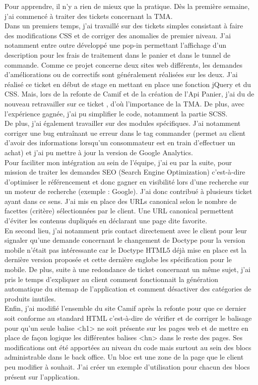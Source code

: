 \documentclass[12pt, a4paper, twoside]{report}
\begin{document}
Pour apprendre, il n'y a rien de mieux que la pratique. Dès la première semaine, j'ai commencé à traiter des tickets concernant la TMA. \\

Dans un premiers temps, j'ai travaillé sur des tickets simples consistant à faire des modifications CSS et de corriger des anomalies de premier niveau. J'ai notamment entre outre développé une pop-in permettant l'affichage d'un description pour les frais de traitement dans le panier et dans le tunnel de commande. Comme ce projet concerne deux sites web différents, les demandes d'améliorations ou de correctifs sont généralement réalisées sur les deux. J'ai réalisé ce ticket en début de stage en mettant en place une fonction jQuery et du CSS. Mais, lors de la refonte de Camif et de la création de l'Api Panier, j'ai du de nouveau retravailler sur ce ticket , d'où l'importance de la TMA. De plus, avec l'expérience gagnée, j'ai pu simplifier le code, notamment la partie SCSS. \\

De plus, j'ai également travailler sur des modules spécifiques. J'ai notamment corriger une bug entraînant ue erreur dans le tag commander (permet au client d'avoir des informations lorsqu'un consommateur est en train d'effectuer un achat) et j'ai pu mettre à jour la version de Google Analytics.  \\

Pour faciliter mon intégration au sein de l'équipe, j'ai eu par la suite, pour mission de traiter les demandes SEO (Search Engine Optimization) c'est-à-dire d'optimiser le référencement et donc gagner en visibilité lors d'une recherche sur un moteur de recherche (exemple : Google). J'ai donc contribué à plusieurs ticket ayant dans ce sens. J'ai mis en place des URLs canonical selon le nombre de facettes (critère) sélectionnées par le client. Une URL canonical permettent d'éviter les contenus dupliqués en déclarant une page dite favorite. \\
En second lieu, j'ai notamment pris contact directement avec le client pour leur signaler qu'une demande concernant le changement de Doctype pour la version mobile n'était pas intéressante car le Doctype HTML5 déjà mise en place est la dernière version proposée et cette dernière englobe les spécification pour le mobile. De plus, suite à une redondance de ticket concernant un même sujet, j'ai pris le temps d'expliquer au client comment fonctionnait la génération automatique du sitemap de l'application et comment désactiver des catégories de produits inutiles. \\
Enfin, j'ai modifié l'ensemble du site Camif après la refonte pour que ce dernier soit conforme au standard HTML c'est-à-dire de vérifier et de corriger le balisage pour qu'un seule balise <h1> ne soit présente sur les pages web et de mettre en place de façon logique les différentes balises <hn> dans le reste des pages. Ses modifications ont été apportées au niveau du code mais surtout au sein des blocs administrable dans le back office. Un bloc est une zone de la page que le client peu modifier à souhait. J'ai créer un exemple d'utilisation pour chacun des blocs présent sur l'application.  
\end{document}

